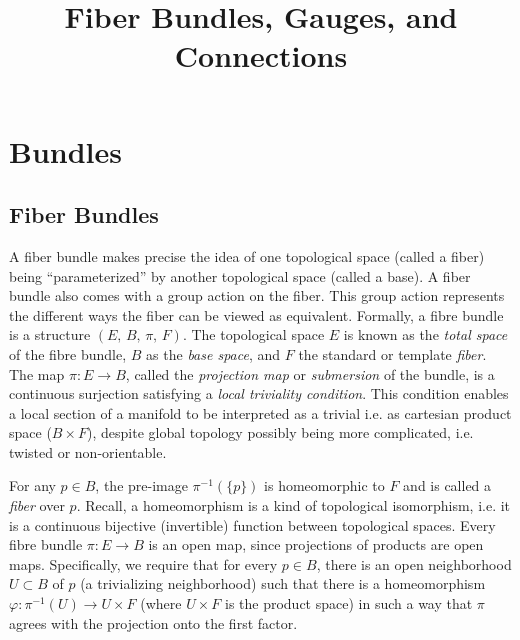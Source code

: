\documentclass{article}
\title{\vspace{-3cm} Fiber Bundles, Gauges, and Connections}
\author{}
\date{}
\theoremstyle{definition}
\begin{document}
\maketitle
\vspace{-1.5cm}
\tableofcontents
\newpage

\section{Bundles}
\subsection{Fiber Bundles}
    
    
    
    
    
    
    A fiber bundle makes precise the idea of one topological space (called a fiber) being ``parameterized'' by another topological space (called a base). A fiber bundle also comes with a group action on the fiber. This group action represents the different ways the fiber can be viewed as equivalent. Formally, a fibre bundle is a structure ${\displaystyle (E,\,B,\,\pi ,\,F)}$. The topological space $E$ is known as the \textit{total space} of the fibre bundle, $B$ as the \textit{base space}, and $F$ the standard or template \textit{fiber}. The map ${\displaystyle \pi :E\rightarrow B}$, called the \textit{projection map} or \textit{submersion} of the bundle, is a continuous surjection satisfying a \textit{local triviality condition}. This condition enables a local section of a manifold to be interpreted as a trivial i.e. as cartesian product space ($B\times F$), despite global topology possibly being more complicated, i.e. twisted or non-orientable.
    
    For any $p \in B$, the pre-image ${\displaystyle \pi ^{-1}(\{p\})}$ is homeomorphic to $F$ and is called a \textit{fiber} over $p$. Recall, a homeomorphism is a kind of topological isomorphism, i.e. it is a continuous bijective (invertible) function between topological spaces. Every fibre bundle ${\displaystyle \pi :E\rightarrow B}$ is an open map, since projections of products are open maps. Specifically, we require that for every $p \in B$, there is an open neighborhood ${\displaystyle U\subset B}$ of $p$ (a trivializing neighborhood) such that there is a homeomorphism ${\displaystyle \varphi :\pi ^{-1}(U)\rightarrow U\times F}$ (where ${\displaystyle U\times F}$ is the product space) in such a way that $\pi$ agrees with the projection onto the first factor.  
    
\end{document}
